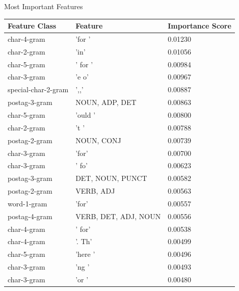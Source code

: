 \documentclass[10pt]{beamer}
\begin{document}
\begin{frame}[fragile]{Most Important Features}
    \begin{table}
        \centering
        \begin{tabular}{lll}
            \textbf{Feature Class} & \textbf{Feature}     & \textbf{Importance Score} \\
            \hline
            char-4-gram            & 'for '               & 0.01230                   \\
            char-2-gram            & 'in'                 & 0.01056                   \\
            char-5-gram            & ' for '              & 0.00984                   \\
            char-3-gram            & 'e o'                & 0.00967                   \\
            special-char-2-gram    & ',,'                 & 0.00887                   \\
            postag-3-gram          & NOUN, ADP, DET       & 0.00863                   \\
            char-5-gram            & 'ould '              & 0.00800                   \\
            char-2-gram            & 't '                 & 0.00788                   \\
            postag-2-gram          & NOUN, CONJ           & 0.00739                   \\
            char-3-gram            & 'for'                & 0.00700                   \\
            char-3-gram            & ' fo'                & 0.00623                   \\
            postag-3-gram          & DET, NOUN, PUNCT     & 0.00582                   \\
            postag-2-gram          & VERB, ADJ            & 0.00563                   \\
            word-1-gram            & 'for'                & 0.00557                   \\
            postag-4-gram          & VERB, DET, ADJ, NOUN & 0.00556                   \\
            char-4-gram            & ' for'               & 0.00538                   \\
            char-4-gram            & '. Th'               & 0.00499                   \\
            char-5-gram            & 'here '              & 0.00496                   \\
            char-3-gram            & 'ng '                & 0.00493                   \\
            char-3-gram            & 'or '                & 0.00480
        \end{tabular}
    \end{table}
\end{frame}
\end{document}
